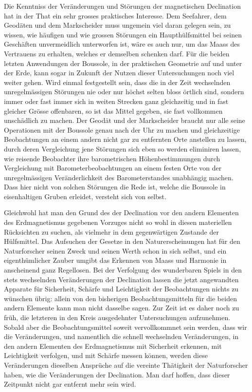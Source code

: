 Die Kenntniss der Veränderungen und Störungen der magnetischen Declination hat in der That ein sehr grosses praktisches Interesse. Dem Seefahrer, dem Geodäten und dem Markscheider muss ungemein viel daran gelegen sein, zu wissen, wie häufigen und wie grossen Störungen ein Haupthülfsmittel bei seinen Geschäften unvermeidlich unterworfen ist, wäre es auch nur, um das Maass des Vertrauens zu erhalten, welches er demselben schenken darf. Für die beiden letzten Anwendungen der Boussole, in der praktischen Geometrie auf und unter der Erde, kann sogar in Zukunft der Nutzen dieser Untersuchungen noch viel weiter gehen. Wird einmal festgestellt sein, dass die in der Zeit wechselnden unregelmässigen Störungen nie oder nur höchst selten bloss örtlich sind, sondern immer oder fast immer sich in weiten Strecken ganz gleichzeitig und in fast gleicher Grösse offenbaren, so ist das Mittel gegeben, sie fast vollkommen unschädlich zu machen. Der Geodät und der Markscheider braucht nur alle seine Operationen mit der Boussole genau nach der Uhr zu machen und gleichzeitige Beobachtungen an einem andern nicht gar zu entfernten Orte anstellen zu lassen, durch deren Vergleichung jene Störungen sich eben so werden eliminiren lassen, wie reisende Beobachter ihre barometrischen Höhenbestimmungen durch Vergleichung mit Barometerbeobachtungen an einem festen Orte von der unregelmässigen Veränderlichkeit des Barometerstandes unabhängig machen. Dass hier nicht von solchen Störungen die Rede ist, welche die Boussole in eisenhaltigen Gruben erleidet, versteht sich von selbst.

Gleichwohl hat man den Grund des der Declination vor den andern Elementen des Erdmagnetismus gegebenen Vorzuges nicht so wohl in diesen materiellen Rücksichten zu suchen, als vielmehr in dem gegenwärtigen Zustande der Hülfsmittel. Das Aufsuchen der Gesetze in den Naturerscheinungen hat für den Naturforscher seinen Zweck und seinen Werth schon in sich selbst, und ein eigenthümlicher Zauber umgibt das Erkennen von Maass und Harmonie in anscheinend ganz Regellosen. Bei der Verfolgung des wunderbaren Spiels in den stets wechselnden Veränderungen der Declination lassen die jetzt angewandten Apparate für Sicherheit, Schärfe und Leichtigkeit der Beobachtungen nichts zu wünschen übrig: allein von den bisherigen Beobachtungsmitteln für die beiden andern Elemente kann man nicht dasselbe sagen. Zur Zeit ist es daher noch zu früh, die letzteren in den Kreis ausgedehnter Untersuchungen aufzunehmen. Sobald aber die Beobachtungsmittel soweit vervollkommnet sein werden, dass wir die Veränderungen, und namentlich die schnell wechselnden Veränderungen, in den andern Elementen des Erdmagnetismus mit Sicherheit erkennen, mit Leichtigkeit verfolgen, und mit Schärfe messen können, werden diese Veränderungen dieselben Ansprüche auf die vereinte Thätigkeit der Naturforscher haben, wie die Veränderungen der Declination. Man darf hoffen, dass dieser Zeitpunkt nicht gar entfernt mehr sein wird.

